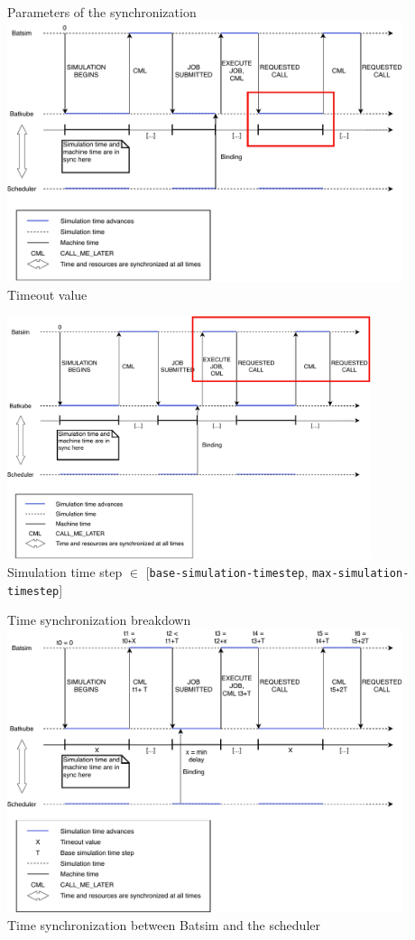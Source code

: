 \documentclass[12pt, aspectratio=43]{beamer}
\begin{document}
\begin{frame}[allowframebreaks]{Parameters of the synchronization}
		\centering
		\includegraphics[width=0.87\textwidth]{../imgs/timeout.pdf}\\
		Timeout value

		\includegraphics[width=0.8\textwidth]{../imgs/max-timestep.pdf}\\
		Simulation time step $\in$ [\texttt{base-simulation-timestep}, \texttt{max-simulation-timestep}]
\end{frame}

\begin{frame}{Time synchronization breakdown}
	\centering
	\includegraphics[width=0.87\textwidth]{../imgs/lignes_de_temps.pdf}\\
	\small{Time synchronization between Batsim and the scheduler}
\end{frame}
\end{document}
